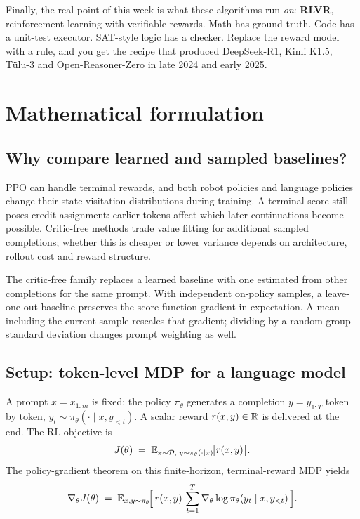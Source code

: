 \documentclass[11pt,oneside]{scrbook}
\begin{document}
Finally, the real point of this week is what these algorithms run \emph{on}:
\textbf{RLVR}, reinforcement learning with verifiable rewards. Math has
ground truth. Code has a unit-test executor. SAT-style logic has a checker.
Replace the reward model with a rule, and you get the recipe that produced
DeepSeek-R1, Kimi K1.5, Tülu-3 and Open-Reasoner-Zero in late 2024 and
early 2025.

\chapter{Mathematical formulation}

\section{Why compare learned and sampled baselines?}
PPO can handle terminal rewards, and both robot policies and language
policies change their state-visitation distributions during training.
A terminal score still poses credit assignment: earlier tokens affect which
later continuations become possible. Critic-free methods trade value fitting
for additional sampled completions; whether this is cheaper or lower variance
depends on architecture, rollout cost and reward structure.

The critic-free family replaces a learned baseline with one estimated from
other completions for the same prompt. With independent on-policy samples,
a leave-one-out baseline preserves the score-function gradient in expectation.
A mean including the current sample rescales that gradient; dividing by a
random group standard deviation changes prompt weighting as well.

\section{Setup: token-level MDP for a language model}

A prompt $x = x_{1:m}$ is fixed; the policy $\pi_\theta$ generates a
completion $y = y_{1:T}$ token by token, $y_t \sim \pi_\theta(\cdot \mid x,
y_{<t})$. A scalar reward $r(x, y) \in \mathbb{R}$ is delivered at the end. The
RL objective is
\[
  J(\theta) \;=\; \mathbb{E}_{x \sim \mathcal{D},\; y \sim \pi_\theta(\cdot \mid x)}\!\big[r(x,y)\big].
\]
The policy-gradient theorem on this finite-horizon, terminal-reward MDP
yields
\begin{equation}\label{eq:pg}
  \nabla_\theta J(\theta) \;=\; \mathbb{E}_{x, y \sim \pi_\theta}\!\Big[\, r(x,y) \,\sum_{t=1}^{T}\nabla_\theta \log \pi_\theta(y_t \mid x, y_{<t})\,\Big].
\end{equation}
\end{document}
